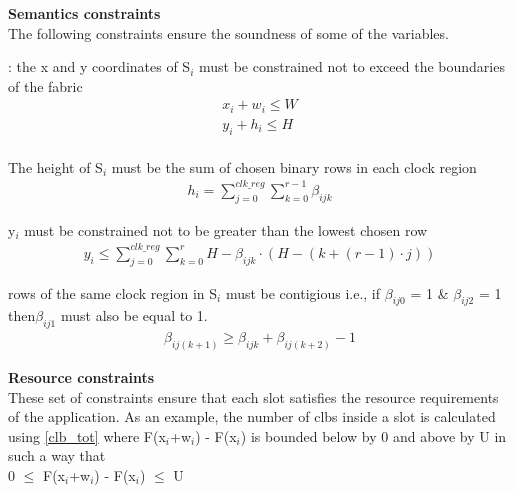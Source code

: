 \documentclass[conference]{IEEEtran}
\begin{document}
\textbf{Semantics constraints} \\
The following constraints ensure the soundness of some of the variables.\\
\begin{constraint}: the x and y coordinates of S$_i$ must be constrained not to exceed the boundaries of the fabric
\begin{equation}
\begin{split}
x_i + w_i \leq W \\
y_i + h_i \leq H \\
\end{split}
\end{equation} 
\end{constraint}


\begin{constraint} The height of S$_i$ must be the sum of chosen binary rows in each clock region
\begin{equation}
\begin{split}
 h_i = \sum_{j=0}^{clk\_reg} \sum_{k=0}^{r-1} \beta_{ijk}
\end{split}
\end{equation}
\end{constraint}

\begin{constraint} y$_i$ must be constrained not to be greater than the lowest chosen row 
\begin{equation}
\begin{split}
y_i \leq \sum_{j=0}^{clk\_reg} \sum_{k=0}^{r} H - \beta_{ijk} \cdot (H - (k + (r - 1) \cdot j))
\end{split}
\end{equation}
\end{constraint}

\begin{constraint} rows of the same clock region in S$_i$ must be contigious i.e., if $\beta_{ij0}$ = 1 \& $\beta_{ij2}$ = 1 then$\beta_{ij1}$ must also be equal to 1.
\begin{equation}
\begin{split}
 \beta_{ij(k+1)} \geq \beta_{ijk} + \beta_{ij(k+2)} - 1 
\end{split}
\end{equation}
\end{constraint}

\textbf{Resource constraints} \\
These set of constraints ensure that each slot satisfies the resource requirements of the application. As an example, the number of clbs inside a slot is calculated using \ref{clb_tot} where F(x$_i$+w$_i$) - F(x$_i$) is bounded below by 0 and above by U in such a way that \\
0 $\leq$ F(x$_i$+w$_i$) - F(x$_i$) $\leq$ U 
\end{document}
